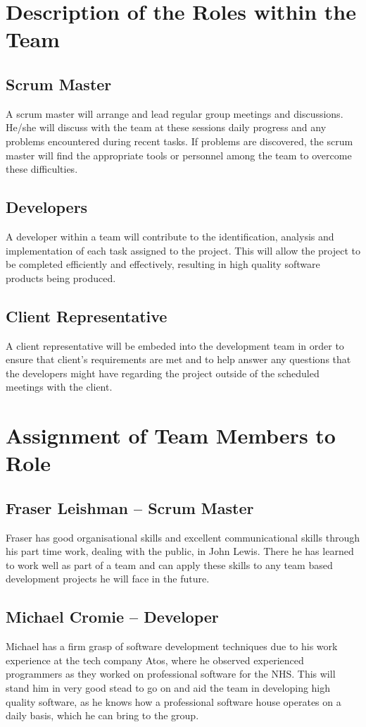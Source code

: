 \documentclass[preprint,12pt]{elsarticle}
\begin{document}
\section{Description of the Roles within the Team}
\subsection*{Scrum Master}
\noindent A scrum master will arrange and lead regular group meetings and discussions.
He/she will discuss with the team at these sessions daily progress and any
problems encountered during recent tasks. If problems are discovered, the scrum
master will find the appropriate tools or personnel among the team to overcome
these difficulties.
\subsection*{Developers}
\noindent A developer within a team will contribute to the identification, analysis and
implementation of each task assigned to the project. This will allow the
project to be completed efficiently and effectively, resulting in high quality
software products being produced. 
\subsection*{Client Representative}
\noindent A client representative will be embeded into the development team in order to 
ensure that client's requirements are met and to help answer any questions that 
the developers might have regarding the project outside of the scheduled meetings
with the client.

\section{Assignment of Team Members to Role}
\subsection*{Fraser Leishman -- Scrum Master}
\noindent Fraser has good organisational skills and excellent communicational skills
through his part time work, dealing with the public, in John Lewis. There he
has learned to work well as part of a team and can apply these skills to any
team based development projects he will face in the future.

\subsection*{Michael Cromie -- Developer}
\noindent Michael has a firm grasp of software development techniques due to his work
experience at the tech company Atos, where he observed experienced programmers
as they worked on professional software for the NHS. This will stand him in
very good stead to go on and aid the team in developing high quality software,
as he knows how a professional software house operates on a daily basis, which
he can bring to the group.
\end{document}

